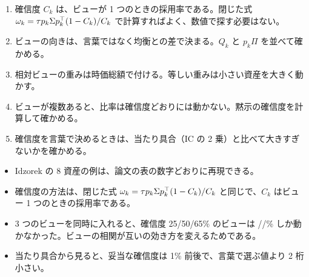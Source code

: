 \begin{tipbox}
\begin{enumerate}
\item 確信度 $C_k$ は、ビューが 1 つのときの採用率である。閉じた式 $\omega_k=\tau p_k\Sigma p_k^{\top}(1-C_k)/C_k$ で計算すればよく、数値で探す必要はない。
\item ビューの向きは、言葉ではなく均衡との差で決まる。$Q_k$ と $p_k\Pi$ を並べて確かめる。
\item 相対ビューの重みは時価総額で付ける。等しい重みは小さい資産を大きく動かす。
\item ビューが複数あると、比率は確信度どおりには動かない。黙示の確信度を計算して確かめる。
\item 確信度を言葉で決めるときは、当たり具合（IC の 2 乗）と比べて大きすぎないかを確かめる。
\end{enumerate}
\end{tipbox}

\begin{keybox}[この章のまとめ]
\begin{itemize}
\item Idzorek の 8 資産の例は、論文の表の数字どおりに再現できる。
\item 確信度の方法は、閉じた式 $\omega_k=\tau p_k\Sigma p_k^{\top}(1-C_k)/C_k$ と同じで、$C_k$ はビュー 1 つのときの採用率である。
\item 3 つのビューを同時に入れると、確信度 25/50/65\% のビューは //\% しか動かなかった。ビューの相関が互いの効き方を変えるためである。
\item 当たり具合から見ると、妥当な確信度は 1\% 前後で、言葉で選ぶ値より 2 桁小さい。
\end{itemize}
\end{keybox}
